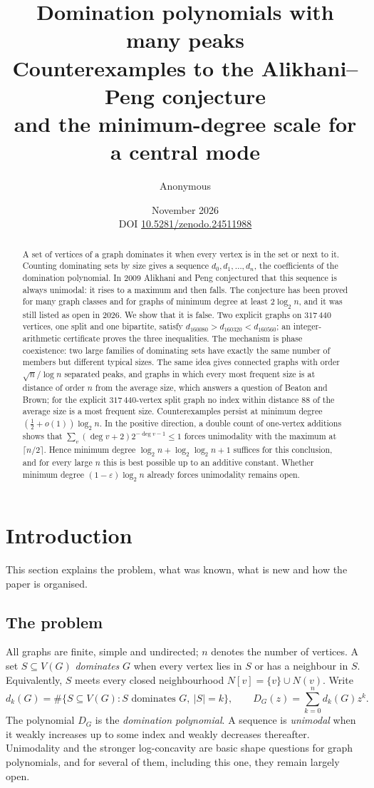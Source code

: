 \documentclass[11pt,a4paper]{article}
\title{Domination polynomials with many peaks\\[5pt]
\large Counterexamples to the Alikhani--Peng conjecture\\
and the minimum-degree scale for a central mode}
\author{Anonymous}
\date{November 2026\\[2pt]\small DOI \href{https://doi.org/10.5281/zenodo.24511988}{10.5281/zenodo.24511988}}
\theoremstyle{definition}
\theoremstyle{remark}
\begin{document}
\maketitle

\begin{abstract}
A set of vertices of a graph dominates it when every vertex is in the set or next to it. Counting dominating sets by size gives a sequence $d_0,d_1,\dots,d_n$, the coefficients of the domination polynomial. In 2009 Alikhani and Peng conjectured that this sequence is always unimodal: it rises to a maximum and then falls. The conjecture has been proved for many graph classes and for graphs of minimum degree at least $2\log_2 n$, and it was still listed as open in 2026. We show that it is false. Two explicit graphs on $317\,440$ vertices, one split and one bipartite, satisfy $d_{160080}>d_{160320}<d_{160560}$; an integer-arithmetic certificate proves the three inequalities. The mechanism is phase coexistence: two large families of dominating sets have exactly the same number of members but different typical sizes. The same idea gives connected graphs with order $\sqrt n/\log n$ separated peaks, and graphs in which every most frequent size is at distance of order $n$ from the average size, which answers a question of Beaton and Brown; for the explicit $317\,440$-vertex split graph no index within distance $88$ of the average size is a most frequent size. Counterexamples persist at minimum degree $(\tfrac12+o(1))\log_2 n$. In the positive direction, a double count of one-vertex additions shows that $\sum_v(\deg v+2)2^{-\deg v-1}\le1$ forces unimodality with the maximum at $\lceil n/2\rceil$. Hence minimum degree $\log_2n+\log_2\log_2n+1$ suffices for this conclusion, and for every large $n$ this is best possible up to an additive constant. Whether minimum degree $(1-\varepsilon)\log_2 n$ already forces unimodality remains open.
\end{abstract}

\section{Introduction}\label{sec:intro}
This section explains the problem, what was known, what is new and how the paper is organised.

\subsection{The problem}
All graphs are finite, simple and undirected; $n$ denotes the number of vertices. A set $S\subseteq V(G)$ \emph{dominates} $G$ when every vertex lies in $S$ or has a neighbour in $S$. Equivalently, $S$ meets every closed neighbourhood $N[v]=\{v\}\cup N(v)$. Write
\[
d_k(G)=\#\{S\subseteq V(G):S\text{ dominates }G,\ |S|=k\},
\qquad D_G(z)=\sum_{k=0}^{n}d_k(G)z^k .
\]
The polynomial $D_G$ is the \emph{domination polynomial}. A sequence is \emph{unimodal} when it weakly increases up to some index and weakly decreases thereafter. Unimodality and the stronger log-concavity are basic shape questions for graph polynomials, and for several of them, including this one, they remain largely open.
\end{document}
